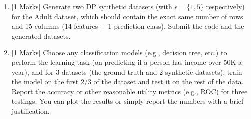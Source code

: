 \documentclass{article}
\newcommand{\0}{\mathbf{0}}
\newcommand{\1}{\mathbf{1}}
\begin{document}
\begin{enumerate}
\begin{enumerate}
    \item {[1 Marks]} Generate two DP synthetic datasets (with $\epsilon = \{ 1, 5\}$ respectively) for the Adult dataset, which should contain the exact same number of rows and 15 columns (14 features + 1 prediction class). Submit the code and the generated datasets. 

    \item {[1 Marks]} Choose any classification models (e.g., decision tree, etc.) to perform the learning task (on predicting if a person has income over 50K a year), and for 3 datasets (the ground truth and 2 synthetic datasets), train the model on the first 2/3 of the dataset and test it on the rest of the data. Report the accuracy or other reasonable utility metrics (e.g., ROC) for three testings. You can plot the results or simply report the numbers with a brief justification. 
\end{enumerate}





\end{enumerate}
\end{document}

